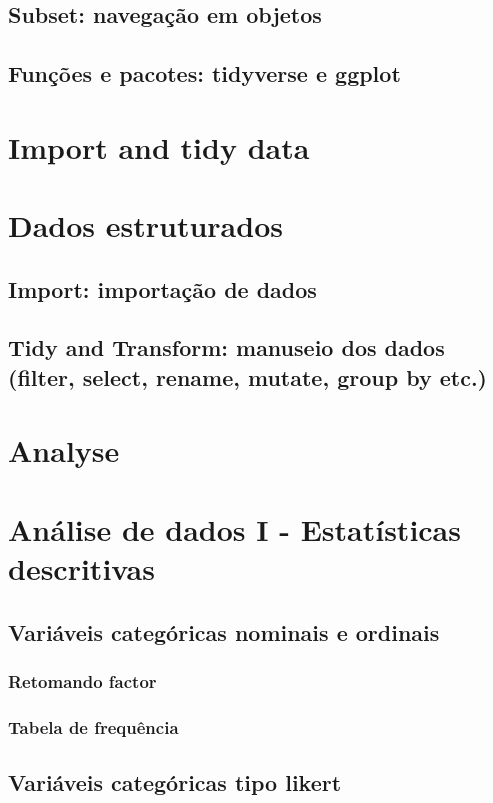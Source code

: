 \documentclass[a4paper,12pt]{article}
\begin{document}
\subsection*{Subset: navegação em objetos}
\subsection*{Funções e pacotes: tidyverse e ggplot}

\section{Import and tidy data}
\section*{Dados estruturados}
\subsection*{Import: importação de dados}
\subsection*{Tidy and Transform: manuseio dos dados (filter, select, rename, mutate, group by etc.)}

\section{Analyse}
\section*{Análise de dados I - Estatísticas descritivas}

\subsection*{Variáveis categóricas nominais e ordinais}
\subsubsection*{Retomando factor}
\subsubsection*{Tabela de frequência}

\subsection*{Variáveis categóricas tipo likert}
\end{document}
